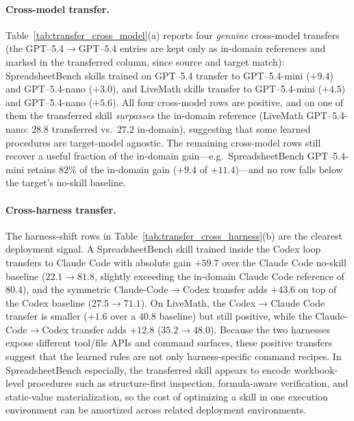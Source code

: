 \paragraph{Cross-model transfer.}
Table~\ref{tab:transfer_cross_model}(a) reports four \emph{genuine} cross-model transfers (the GPT--5.4{$\to$}GPT--5.4 entries are kept only as in-domain references and marked \na{} in the transferred column, since source and target match): SpreadsheetBench skills trained on GPT--5.4 transfer to GPT--5.4-mini ($+9.4$) and GPT--5.4-nano ($+3.0$), and LiveMath skills transfer to GPT--5.4-mini ($+4.5$) and GPT--5.4-nano ($+5.6$). All four cross-model rows are positive, and on one of them the transferred skill \emph{surpasses} the in-domain \ourmethod{} reference (LiveMath GPT--5.4-nano: $28.8$ transferred vs.\ $27.2$ in-domain), suggesting that some learned procedures are target-model agnostic. The remaining cross-model rows still recover a useful fraction of the in-domain gain---e.g.\ SpreadsheetBench GPT--5.4-mini retains $82\%$ of the in-domain gain ($+9.4$ of $+11.4$)---and no row falls below the target's no-skill baseline.

\paragraph{Cross-harness transfer.}
The harness-shift rows in Table~\ref{tab:transfer_cross_harness}(b) are the clearest deployment signal. A SpreadsheetBench skill trained inside the Codex loop transfers to Claude Code with absolute gain $+59.7$ over the Claude Code no-skill baseline ($22.1{\to}81.8$, slightly exceeding the in-domain Claude Code \ourmethod{} reference of $80.4$), and the symmetric Claude-Code$\to$Codex transfer adds $+43.6$ on top of the Codex baseline ($27.5{\to}71.1$). On LiveMath, the Codex$\to$Claude Code transfer is smaller ($+1.6$ over a $40.8$ baseline) but still positive, while the Claude-Code$\to$Codex transfer adds $+12.8$ ($35.2{\to}48.0$). Because the two harnesses expose different tool/file APIs and command surfaces, these positive transfers suggest that the learned rules are not only harness-specific command recipes. In SpreadsheetBench especially, the transferred skill appears to encode workbook-level procedures such as structure-first inspection, formula-aware verification, and static-value materialization, so the cost of optimizing a skill in one execution environment can be amortized across related deployment environments.

